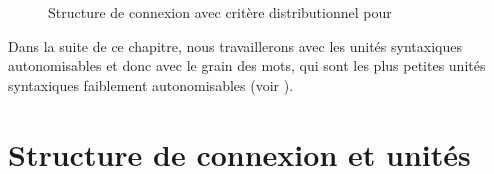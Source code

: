 \begin{figure}
\caption{Structure de connexion avec critère distributionnel pour }
\label{fig:regardait2}
\end{figure}

Dans la suite de ce chapitre, nous travaillerons avec les unités syntaxiques autonomisables et donc avec le grain des mots, qui sont les plus petites unités syntaxiques faiblement autonomisables (voir ).

\section{Structure de connexion et unités}\label{sec:3.2.19}

